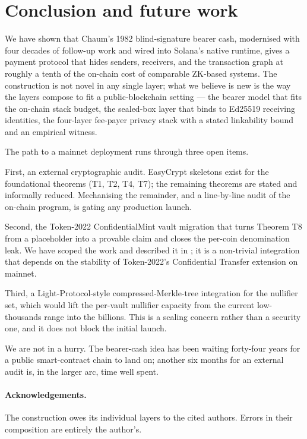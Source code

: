 \section{Conclusion and future work}
\label{sec:conclusion}

We have shown that Chaum's 1982 blind-signature bearer cash, modernised with four decades of follow-up work and wired into Solana's native runtime, gives a payment protocol that hides senders, receivers, and the transaction graph at roughly a tenth of the on-chain cost of comparable ZK-based systems. The construction is not novel in any single layer; what we believe is new is the way the layers compose to fit a public-blockchain setting --- the bearer model that fits the on-chain stack budget, the sealed-box layer that binds to Ed25519 receiving identities, the four-layer fee-payer privacy stack with a stated linkability bound and an empirical witness.

The path to a mainnet deployment runs through three open items.

First, an external cryptographic audit. EasyCrypt skeletons exist for the foundational theorems (T1, T2, T4, T7); the remaining theorems are stated and informally reduced. Mechanising the remainder, and a line-by-line audit of the on-chain program, is gating any production launch.

Second, the Token-2022 ConfidentialMint vault migration that turns Theorem T8 from a placeholder into a provable claim and closes the per-coin denomination leak. We have scoped the work and described it in ; it is a non-trivial integration that depends on the stability of Token-2022's Confidential Transfer extension on mainnet.

Third, a Light-Protocol-style compressed-Merkle-tree integration for the nullifier set, which would lift the per-vault nullifier capacity from the current low-thousands range into the billions. This is a scaling concern rather than a security one, and it does not block the initial launch.

We are not in a hurry. The bearer-cash idea has been waiting forty-four years for a public smart-contract chain to land on; another six months for an external audit is, in the larger arc, time well spent.

\paragraph{Acknowledgements.} The construction owes its individual layers to the cited authors. Errors in their composition are entirely the author's.
